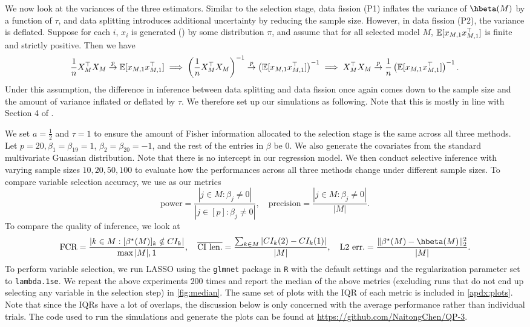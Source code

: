 We now look at the variances of the three estimators. Similar to the selection stage, data fission (P1) inflates the variance of $\hbeta(M)$ by a function of $\tau$, and data splitting introduces additional uncertainty by reducing the sample size. However, in data fission (P2), the variance is deflated. Suppose for each $i$, $x_i$ is generated (\iid) by some distribution $\pi$, and assume that for all selected model $M$, $\mathbb{E}[x_{M,1}x_{M,1}^\top]$ is finite and strictly positive. Then we have
\[
\frac{1}{n}X_M^\top X_M \overset{p}{\to} \mathbb{E}[x_{M,1}x_{M,1}^\top] \implies \left(\frac{1}{n}X_M^\top X_M\right)^{-1} \overset{p}{\to} \left( \mathbb{E}[x_{M,1}x_{M,1}^\top] \right)^{-1} \implies X_M^\top X_M \overset{p}{\to} \frac{1}{n}\left( \mathbb{E}[x_{M,1}x_{M,1}^\top] \right)^{-1}.
\]
Under this assumption, the difference in inference between data splitting and data fission once again comes down to the sample size and the amount of variance inflated or deflated by $\tau$. We therefore set up our simulations as following. Note that this is mostly in line with Section 4 of \cite{leiner2022data}.

We set $a = \frac{1}{2}$ and $\tau=1$ to ensure the amount of Fisher information allocated to the selection stage is the same across all three methods. Let $p=20, \beta_1=\beta_{19}=1$, $\beta_2=\beta_{20}=-1$, and the rest of the entries in $\beta$ be $0$. We also generate the covariates from the standard multivariate Guassian distribution. Note that there is no intercept in our regression model. We then conduct selective inference with varying sample sizes $10, 20, 50, 100$ to evaluate how the performances across all three methods change under different sample sizes. To compare variable selection accuracy, we use as our metrics
\[
\text{power} = \frac{|j\in M: \beta_j \neq 0|}{|j\in [p]: \beta_j \neq 0|}, \quad \text{precision} = \frac{|j\in M: \beta_j \neq 0|}{|M|}.
\]
To compare the quality of inference, we look at
\[
\text{FCR} = \frac{|k\in M: [\beta^\star(M)]_k \notin CI_k|}{\max{|M|, 1}}, \quad \overline{\text{CI len.}} = \frac{\sum_{k\in M} |CI_k(2) - CI_k(1)|}{|M|}, \quad \text{L2 err.} = \frac{\| \beta^\star(M) - \hbeta(M) \|_2^2}{|M|}.
\]
To perform variable selection, we run LASSO using the \texttt{glmnet} package in \texttt{R} with the default settings and the regularization parameter set to \texttt{lambda.1se}. We repeat the above experiments $200$ times and report the median of the above metrics (excluding runs that do not end up selecting any variable in the selection step) in \cref{fig:median}. The same set of plots with the IQR of each metric is included in \cref{apdx:plots}. Note that since the IQRs have a lot of overlaps, the discussion below is only concerned with the average performance rather than individual trials. The code used to run the simulations and generate the plots can be found at \url{https://github.com/NaitongChen/QP-3}.

